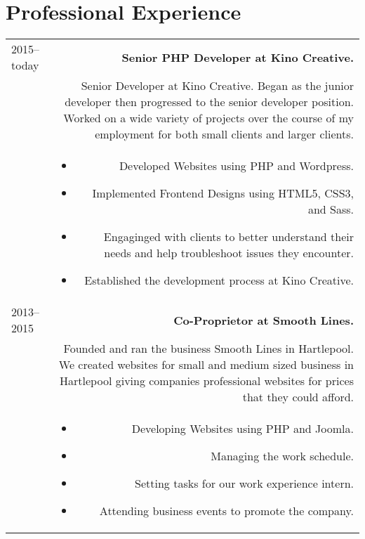 \documentclass[10pt]{article}
\begin{document}
\section*{Professional Experience}
\begin{tabular}{L!{\VRule}R}
2015--today&{\bf Senior PHP Developer at Kino Creative.}\\
&Senior Developer at Kino Creative. Began as the junior developer then progressed to the senior developer position. Worked on a wide variety of projects over the course of my employment for both small clients and larger clients.\\
&\begin{itemize}
\item Developed Websites using PHP and Wordpress.
\item Implemented Frontend Designs using HTML5, CSS3, and Sass.
\item Engaginged with clients to better understand their needs and help troubleshoot issues they encounter.
\item Established the development process at Kino Creative.
\end{itemize}\\
2013--2015&{\bf Co-Proprietor at Smooth Lines.}\\
&Founded and ran the business Smooth Lines in Hartlepool. We created websites for small and medium sized business in Hartlepool giving companies professional websites for prices that they could afford.\\
&\begin{itemize}
\item Developing Websites using PHP and Joomla.
\item Managing the work schedule.
\item Setting tasks for our work experience intern.
\item Attending business events to promote the company.
\end{itemize}\\
\end{tabular}
\end{document}

